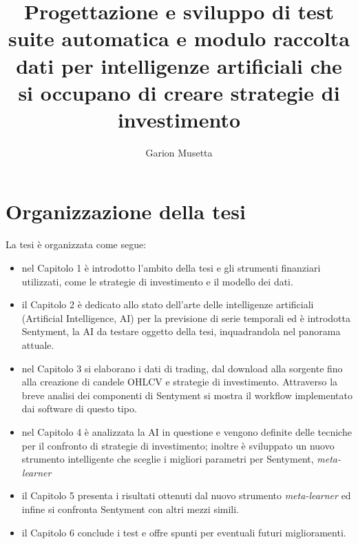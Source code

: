 \documentclass[a4paper,12pt]{report}
\begin{document}
\title{Progettazione e sviluppo di test suite automatica e modulo raccolta dati per intelligenze artificiali che si occupano di creare strategie di investimento}
\author{Garion Musetta}
%
% 
%
\beforepreface
% 
%

%
%
\section*{Organizzazione della tesi}
\label{organizzazione}
La tesi \`e organizzata come segue:
\begin{itemize}
\item nel Capitolo 1 è introdotto l'ambito della tesi e gli strumenti finanziari utilizzati, come le strategie di investimento e il modello dei dati.
\item il Capitolo 2 è dedicato allo stato dell'arte delle intelligenze artificiali (Artificial Intelligence, AI) per la previsione di serie temporali ed è introdotta Sentyment, la AI da testare oggetto della tesi, inquadrandola nel panorama attuale.
\item nel Capitolo 3 si elaborano i dati di trading, dal download alla sorgente fino alla creazione di candele OHLCV e strategie di investimento. Attraverso la breve analisi dei componenti di Sentyment si mostra il workflow implementato dai software di questo tipo.
\item nel Capitolo 4 è analizzata la AI in questione e vengono definite delle tecniche per il confronto di strategie di investimento; inoltre è sviluppato un nuovo strumento intelligente che sceglie i migliori parametri per Sentyment, \textit{meta-learner}
\item il Capitolo 5 presenta i risultati ottenuti dal nuovo strumento \textit{meta-learner} ed infine si confronta Sentyment con altri mezzi simili.
\item il Capitolo 6 conclude i test e offre spunti per eventuali futuri miglioramenti.
\end{itemize}
%
%
\end{document}
